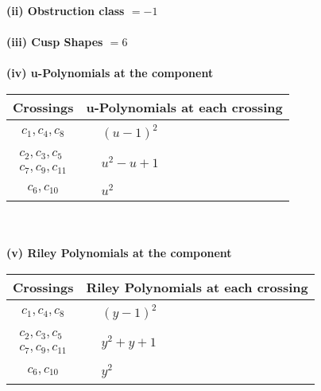 \documentclass[1p]{elsarticle_modified}
\theoremstyle{definition}
\begin{document}
\flushleft \textbf{(ii) Obstruction class $= -1$}\\~\\
\flushleft \textbf{(iii) Cusp Shapes $= 6$}\\~\\
\newpage\renewcommand{\arraystretch}{1}
\flushleft \textbf{(iv) u-Polynomials at the component}\newline \\
\begin{tabular}{m{50pt}|m{274pt}}
Crossings & \hspace{64pt}u-Polynomials at each crossing \\
\hline $$\begin{aligned}c_{1},c_{4},c_{8}\end{aligned}$$&$\begin{aligned}
&(u-1)^2
\end{aligned}$\\
\hline $$\begin{aligned}c_{2},c_{3},c_{5}\\c_{7},c_{9},c_{11}\end{aligned}$$&$\begin{aligned}
&u^2- u+1
\end{aligned}$\\
\hline $$\begin{aligned}c_{6},c_{10}\end{aligned}$$&$\begin{aligned}
&u^2
\end{aligned}$\\
\hline
\end{tabular}\\~\\
\newpage\renewcommand{\arraystretch}{1}
\flushleft \textbf{(v) Riley Polynomials at the component}\newline \\
\begin{tabular}{m{50pt}|m{274pt}}
Crossings & \hspace{64pt}Riley Polynomials at each crossing \\
\hline $$\begin{aligned}c_{1},c_{4},c_{8}\end{aligned}$$&$\begin{aligned}
&(y-1)^2
\end{aligned}$\\
\hline $$\begin{aligned}c_{2},c_{3},c_{5}\\c_{7},c_{9},c_{11}\end{aligned}$$&$\begin{aligned}
&y^2+y+1
\end{aligned}$\\
\hline $$\begin{aligned}c_{6},c_{10}\end{aligned}$$&$\begin{aligned}
&y^2
\end{aligned}$\\
\hline
\end{tabular}\\~\\
\end{document}
